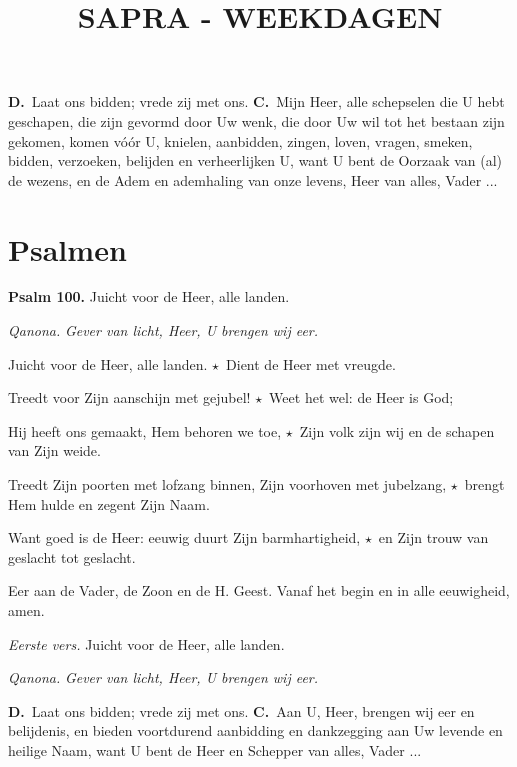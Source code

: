 \documentclass[12pt,twoside,a5paper]{article}
\let\oldtitle\title
\renewcommand{\title}[1]{\oldtitle{\MakeUppercase{#1}}}
\newlength{\origparskip}
\newenvironment{halfparskip}{
  \setlength{\parskip}{0.5\origparskip}
}{
  \setlength{\parskip}{\origparskip}
}
\newcommand{\cc}{{\color{BrickRed} \textbf{C.}}}
\newcommand{\dd}{{\color{BrickRed} \textbf{D.}}}
\newcommand{\sep}{{\color{BrickRed} \textbf{$\star$}}}
\newcommand{\liturgicalhint}[1]{{\color{BrickRed}\footnotesize\itshape{#1}}}
\newcommand{\liturgicaloption}[1]{{\color{BrickRed}\textbf{#1}}}
\newcommand{\qanona}[1]{{\liturgicalhint{Qanona.}} \emph{#1}}
\newcommand{\psalm}[1]{\liturgicaloption{Psalm #1.}}
\newcommand{\markedsection}[1]{\section*{#1}\markboth{#1}{}}
\begin{document}
\title{Sapra - weekdagen}
\author{}
\date{}
\maketitle


\dd\ Laat ons bidden; vrede zij met ons. \cc\ Mijn Heer, alle schepselen die U hebt geschapen, die zijn gevormd door Uw wenk, die door Uw wil tot het bestaan zijn gekomen, komen vóór U, knielen, aanbidden, zingen, loven, vragen, smeken, bidden, verzoeken, belijden en verheerlijken U, want U bent de Oorzaak van (al) de wezens, en de Adem en ademhaling van onze levens, Heer van alles, Vader ...


\markedsection{Psalmen}

\begin{halfparskip}
  \psalm{100} Juicht voor de Heer, alle landen.

  \qanona{Gever van licht, Heer, U brengen wij eer.}

  Juicht voor de Heer, alle landen. \sep\ Dient de Heer met vreugde.

  Treedt voor Zijn aanschijn met gejubel! \sep\ Weet het wel: de Heer is God;

  Hij heeft ons gemaakt, Hem behoren we toe, \sep\ Zijn volk zijn wij en de schapen van Zijn weide.

  Treedt Zijn poorten met lofzang binnen, Zijn voorhoven met jubelzang, \sep\ brengt Hem hulde en zegent Zijn Naam.

  Want goed is de Heer: eeuwig duurt Zijn barmhartigheid, \sep\ en Zijn trouw van geslacht tot geslacht.

  Eer aan de Vader, de Zoon en de H. Geest. Vanaf het begin en in alle eeuwigheid, amen.

  \liturgicalhint{Eerste vers.} Juicht voor de Heer, alle landen.

  \qanona{Gever van licht, Heer, U brengen wij eer.}
\end{halfparskip}

\dd\ Laat ons bidden; vrede zij met ons.
\cc\ Aan U, Heer, brengen wij eer en belijdenis, en bieden voortdurend aanbidding en dankzegging aan Uw levende en heilige Naam, want U bent de Heer en Schepper van alles, Vader ...
\end{document}
